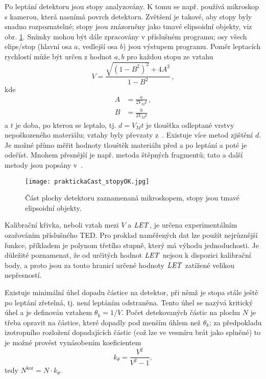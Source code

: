 Po leptání detektoru jsou stopy analyzovány. K tomu se např. používá mikroskop s kamerou, která nasnímá povrch detektoru. Zvětšení je takové, aby stopy byly snadno rozpoznatelné; stopy jsou znázorněny jako tmavé elipsoidní objekty, viz obr. \ref{fig:detektory_stopy}. Snímky mohou být dále zpracovány v příslušném programu; osy všech elips/stop (hlavní osa $a$, vedlejší osa $b$) jsou výstupem programu. 
Poměr leptacích rychlostí může být určen z hodnot $a,b$ pro každou stopu ze vztahu
\begin{equation}
  V=\frac{\sqrt{\left( 1-B^2 \right)^2}+4A^2}{1-B^2}\,,
  \label{eq:pomerLepRychlosti}
\end{equation}
kde
\begin{align*}
  A&=\frac{a}{2V_Mt}\,,\\
  B&=\frac{b}{2V_Mt}
\end{align*}
a $t$ je doba, po kterou se leptalo, tj. $d=V_Mt$ je tloušťka odleptané vrstvy nepoškozeného materiálu; vztahy byly převzaty z~\cite{ssntd}. Existuje více metod zjištění $d$. Je možné přímo měřit hodnoty tlouštěk materiálu před a po leptání a poté je odečíst. Mnohem přesnější je např. metoda štěpných fragmentů; tato a další metody jsou popsány v~\cite{thesisKPBrabcova}.    
\begin{figure}[ht]
  \centering
  \texttt{[image: praktickaCast\_stopyOK.jpg]}
  \caption{Část plochy detektoru zaznamenaná mikroskopem, stopy jsou tmavé elipsoidní objekty.}
  \label{fig:detektory_stopy}
\end{figure}

Kalibrační křivka, neboli vztah mezi $V$ a $\mathit{LET}$, je určena experimentálním ozařováním příslušného TED. Pro proklad naměřených dat lze použít nejrůznější funkce, příkladem je polynom třetího stupně, který má výhodu jednoduchosti. Je důležité poznamenat, že od určitých hodnot $\mathit{LET}$ nejsou k dispozici kalibrační body, a proto jsou za touto hranicí určené hodnoty $\mathit{LET}$ zatížené velikou nepřesností.

Existuje minimální úhel dopadu částice na detektor, při němž je stopa stále ještě po leptání zřetelná, tj. není leptáním odstraněna. Tento úhel se nazývá kritický úhel a je definován vztahem $\theta_k=1/V$. Počet detekovaných částic na plochu $N$ je třeba opravit na částice, které dopadly pod menším úhlem než $\theta_k$; za předpokladu izotropního rozložení dopadajících částic (což lze ve vesmíru brát jako splněné) to je možné provést vynásobením koeficientem 
\begin{equation}
  k_{\theta}=\frac{V^2}{V^2-1},
  \label{eq:kritickyUhel}
\end{equation}
tedy $N^{\text{kor}}=N\cdot k_{\theta}$. 

